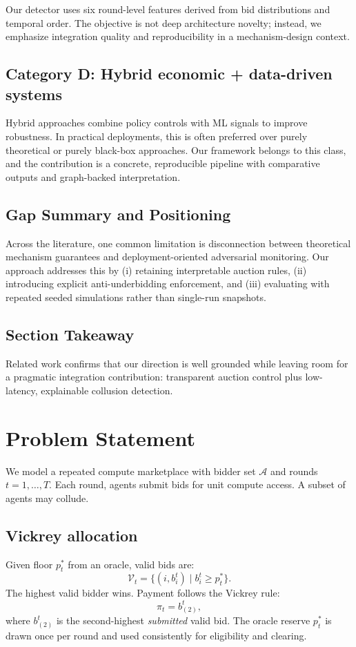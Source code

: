 \documentclass[journal]{IEEEtran}
\begin{document}
Our detector uses six round-level features derived from bid distributions and temporal order. The objective is not deep architecture novelty; instead, we emphasize integration quality and reproducibility in a mechanism-design context.

\subsection{Category D: Hybrid economic + data-driven systems}
Hybrid approaches combine policy controls with ML signals to improve robustness. In practical deployments, this is often preferred over purely theoretical or purely black-box approaches. Our framework belongs to this class, and the contribution is a concrete, reproducible pipeline with comparative outputs and graph-backed interpretation.

\subsection{Gap Summary and Positioning}
Across the literature, one common limitation is disconnection between theoretical mechanism guarantees and deployment-oriented adversarial monitoring. Our approach addresses this by (i) retaining interpretable auction rules, (ii) introducing explicit anti-underbidding enforcement, and (iii) evaluating with repeated seeded simulations rather than single-run snapshots.

\subsection{Section Takeaway}
Related work confirms that our direction is well grounded while leaving room for a pragmatic integration contribution: transparent auction control plus low-latency, explainable collusion detection.

\section{Problem Statement}
We model a repeated compute marketplace with bidder set $\mathcal{A}$ and rounds $t=1,\dots,T$. Each round, agents submit bids for unit compute access. A subset of agents may collude.

\subsection{Vickrey allocation}
Given floor $p_t^\ast$ from an oracle, valid bids are:
\begin{equation}
\mathcal{V}_t = \{(i,b_i^t)\mid b_i^t \ge p_t^\ast\}.
\end{equation}
The highest valid bidder wins. Payment follows the Vickrey rule:
\begin{equation}
\pi_t = b_{(2)}^t,
\end{equation}
where $b_{(2)}^t$ is the second-highest \emph{submitted} valid bid. The oracle reserve $p_t^\ast$ is drawn once per round and used consistently for eligibility and clearing.
\end{document}
